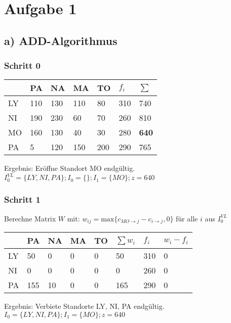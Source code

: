 \documentclass[a4paper,11pt]{article}
\begin{document}
\raggedright %
\setlength{\mathindent}{0cm} %

\section*{Aufgabe 1}
\subsection*{a) ADD-Algorithmus}
\subsubsection*{Schritt 0}
\begin{tabular}{l|l|l|l|l|l||l}
      & PA & NA & MA & TO & $f_i$ & $\sum$ \\ \hline
  LY  & 110 & 130 & 110 & 80 & 310 & 740 \\ \hline
  NI  & 190 & 230 & 60 & 70 & 260 & 810 \\ \hline
  MO  & 160 & 130 & 40 & 30 & 280 & \textbf{640} \\ \hline
  PA  & 5 & 120 & 150 & 200 & 290 & 765 \\ 
\end{tabular} \newline

Ergebnis: Eröffne Standort MO endgültig. \\
$I_0^{VL} = \{LY, NI, PA\}; I_0 = \{ \}; I_1 = \{MO\}; z = 640$

\subsubsection*{Schritt 1}
Berechne Matrix $W$ mit: $w_{ij} = \text{max} \{c_{MO \to j} - c_{i \to j}, 0\}$ für alle $i$ aus $I_0^{VL}$ \\

\begin{tabular}{l|l|l|l|l||l|l|l}
    & PA & NA & MA & TO & $\sum w_i$ & $f_i$ & $w_i - f_i$ \\ \hline
LY  & 50 & 0 & 0 & 0 & 50 & 310 & 0 \\ \hline
NI  & 0 & 0 & 0 & 0 & 0 & 260 & 0 \\ \hline
PA  & 155 & 10 & 0 & 0 & 165 & 290 & 0 \\ 
\end{tabular} \newline

Ergebnis: Verbiete Standorte LY, NI, PA endgültig. \\
$I_0 = \{ LY, NI, PA \}; I_1 = \{ MO \}; z = 640$ \\
\end{document}

